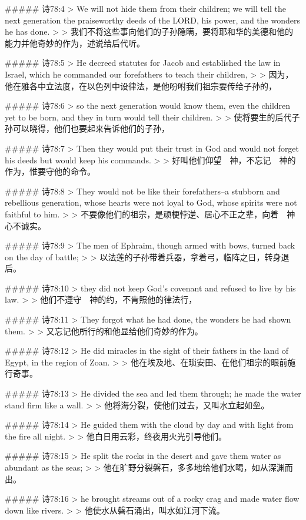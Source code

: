##### 诗78:4
> We will not hide them from their children; we will tell the next generation the praiseworthy deeds of the LORD, his power, and the wonders he has done.
>
> 我们不将这些事向他们的子孙隐瞒，要将耶和华的美德和他的能力并他奇妙的作为，述说给后代听。


##### 诗78:5
> He decreed statutes for Jacob and established the law in Israel, which he commanded our forefathers to teach their children,
>
> 因为，他在雅各中立法度，在以色列中设律法，是他吩咐我们祖宗要传给子孙的，


##### 诗78:6
> so the next generation would know them, even the children yet to be born, and they in turn would tell their children.
>
> 使将要生的后代子孙可以晓得，他们也要起来告诉他们的子孙，


##### 诗78:7
> Then they would put their trust in God and would not forget his deeds but would keep his commands.
>
> 好叫他们仰望　神，不忘记　神的作为，惟要守他的命令。


##### 诗78:8
> They would not be like their forefathers--a stubborn and rebellious generation, whose hearts were not loyal to God, whose spirits were not faithful to him.
>
> 不要像他们的祖宗，是顽梗悖逆、居心不正之辈，向着　神心不诚实。


##### 诗78:9
> The men of Ephraim, though armed with bows, turned back on the day of battle;
>
> 以法莲的子孙带着兵器，拿着弓，临阵之日，转身退后。


##### 诗78:10
> they did not keep God's covenant and refused to live by his law.
>
> 他们不遵守　神的约，不肯照他的律法行，


##### 诗78:11
> They forgot what he had done, the wonders he had shown them.
>
> 又忘记他所行的和他显给他们奇妙的作为。


##### 诗78:12
> He did miracles in the sight of their fathers in the land of Egypt, in the region of Zoan.
>
> 他在埃及地、在琐安田、在他们祖宗的眼前施行奇事。


##### 诗78:13
> He divided the sea and led them through; he made the water stand firm like a wall.
>
> 他将海分裂，使他们过去，又叫水立起如垒。


##### 诗78:14
> He guided them with the cloud by day and with light from the fire all night.
>
> 他白日用云彩，终夜用火光引导他们。


##### 诗78:15
> He split the rocks in the desert and gave them water as abundant as the seas;
>
> 他在旷野分裂磐石，多多地给他们水喝，如从深渊而出。


##### 诗78:16
> he brought streams out of a rocky crag and made water flow down like rivers.
>
> 他使水从磐石涌出，叫水如江河下流。


